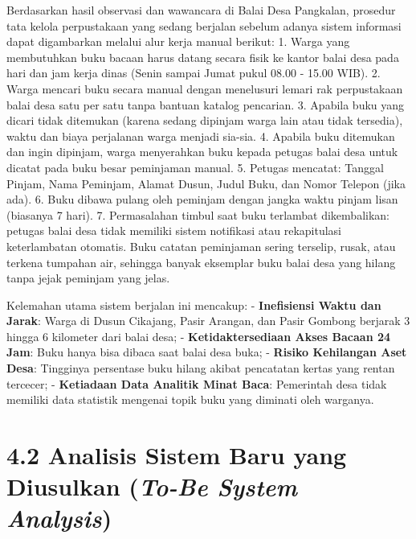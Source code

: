 \documentclass[
  indonesian,
  12pt,
]{report}
\begin{document}
Berdasarkan hasil observasi dan wawancara di Balai Desa Pangkalan,
prosedur tata kelola perpustakaan yang sedang berjalan sebelum adanya
sistem informasi dapat digambarkan melalui alur kerja manual berikut: 1.
Warga yang membutuhkan buku bacaan harus datang secara fisik ke kantor
balai desa pada hari dan jam kerja dinas (Senin sampai Jumat pukul 08.00
- 15.00 WIB). 2. Warga mencari buku secara manual dengan menelusuri
lemari rak perpustakaan balai desa satu per satu tanpa bantuan katalog
pencarian. 3. Apabila buku yang dicari tidak ditemukan (karena sedang
dipinjam warga lain atau tidak tersedia), waktu dan biaya perjalanan
warga menjadi sia-sia. 4. Apabila buku ditemukan dan ingin dipinjam,
warga menyerahkan buku kepada petugas balai desa untuk dicatat pada buku
besar peminjaman manual. 5. Petugas mencatat: Tanggal Pinjam, Nama
Peminjam, Alamat Dusun, Judul Buku, dan Nomor Telepon (jika ada). 6.
Buku dibawa pulang oleh peminjam dengan jangka waktu pinjam lisan
(biasanya 7 hari). 7. Permasalahan timbul saat buku terlambat
dikembalikan: petugas balai desa tidak memiliki sistem notifikasi atau
rekapitulasi keterlambatan otomatis. Buku catatan peminjaman sering
terselip, rusak, atau terkena tumpahan air, sehingga banyak eksemplar
buku balai desa yang hilang tanpa jejak peminjam yang jelas.

Kelemahan utama sistem berjalan ini mencakup: - \textbf{Inefisiensi
Waktu dan Jarak}: Warga di Dusun Cikajang, Pasir Arangan, dan Pasir
Gombong berjarak 3 hingga 6 kilometer dari balai desa; -
\textbf{Ketidaktersediaan Akses Bacaan 24 Jam}: Buku hanya bisa dibaca
saat balai desa buka; - \textbf{Risiko Kehilangan Aset Desa}: Tingginya
persentase buku hilang akibat pencatatan kertas yang rentan tercecer; -
\textbf{Ketiadaan Data Analitik Minat Baca}: Pemerintah desa tidak
memiliki data statistik mengenai topik buku yang diminati oleh warganya.

\section{\texorpdfstring{4.2 Analisis Sistem Baru yang Diusulkan
(\emph{To-Be System
Analysis})}{4.2 Analisis Sistem Baru yang Diusulkan (To-Be System Analysis)}}\label{analisis-sistem-baru-yang-diusulkan-to-be-system-analysis}
\end{document}
